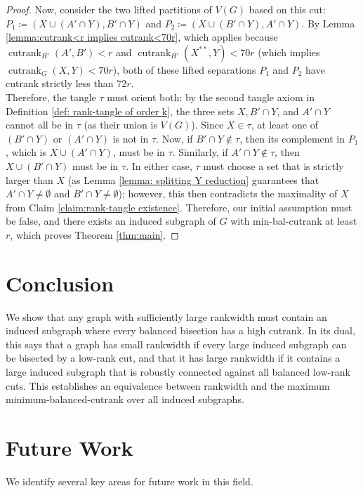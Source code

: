 \documentclass{article}
\theoremstyle{definition}
\begin{document}
\begin{proof}
Now, consider the two lifted partitions of $V(G)$ based on this cut: $P_1 \coloneqq (X\cup (A'\cap Y), B'\cap Y)$ and $P_2\coloneqq (X\cup (B'\cap Y), A'\cap Y)$. 
By Lemma \ref{lemma:cutrank<r implies cutrank<70r}, which applies because $\operatorname{cutrank}_{H'}(A', B') < r$ and $\operatorname{cutrank}_{H'}(X^{**}, Y) < 70r$ (which implies $\operatorname{cutrank}_G(X,Y) < 70r$), both of these lifted separations $P_1$ and $P_2$ have cutrank strictly less than $72r$. \\

Therefore, the tangle $\tau$ must orient both: by the second tangle axiom in Definition \ref{def: rank-tangle of order k}, the three sets $X, B'\cap Y$, and $A'\cap Y$ cannot all be in $\tau$ (as their union is $V(G)$). Since $X\in \tau$, at least one of $(B'\cap Y)$ or $(A'\cap Y)$ is not in $\tau$. Now, if $B'\cap Y \notin \tau$, then its complement in $P_1$, which is $X\cup (A'\cap Y)$, must be in $\tau$. Similarly, if $A'\cap Y\notin \tau$, then $X\cup (B'\cap Y)$ must be in $\tau$. In either case, $\tau$ must choose a set that is strictly larger than $X$ (as Lemma \ref{lemma: splitting Y reduction} guarantees that $A'\cap Y \neq \emptyset$ and $B'\cap Y \neq \emptyset$); however, this then contradicts the maximality of $X$ from Claim \ref{claim:rank-tangle existence}. Therefore, our initial assumption must be false, and there exists an induced subgraph of $G$ with min-bal-cutrank at least $r$, which proves Theorem \ref{thm:main}.\qedhere
\end{proof}

\section{Conclusion}

We show that any graph with sufficiently large rankwidth must contain an induced subgraph where every balanced bisection has a high cutrank. In its dual, this says that a graph has small rankwidth if every large induced subgraph can be bisected by a low-rank cut, and that it has large rankwidth if it contains a large induced subgraph that is robustly connected against all balanced low-rank cuts. This establishes an equivalence between rankwidth and the maximum minimum-balanced-cutrank over all induced subgraphs. 

\section{Future Work} We identify several key areas for future work in this field. \\
\end{document}
